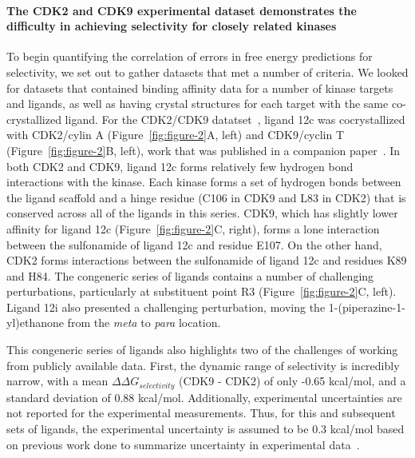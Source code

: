 \documentclass[9pt,lineno]{elife-modified} %
\begin{document}
\paragraph{The CDK2 and CDK9 experimental dataset demonstrates the difficulty in achieving selectivity for closely related kinases}

To begin quantifying the correlation of errors in free energy predictions for selectivity, we set out to gather datasets that met a number of criteria. We looked for datasets that contained binding affinity data for a number of kinase targets and ligands, as well as having crystal structures for each target with the same co-crystallized ligand. For the CDK2/CDK9 datatset~\citep{Shao2013-oe}, ligand 12c was cocrystallized with CDK2/cylin A (Figure~\ref{fig:figure-2}A, left) and CDK9/cyclin T (Figure~\ref{fig:figure-2}B, left), work that was published in a companion paper~\citep{Hole2013-sr}. In both CDK2 and CDK9, ligand 12c forms relatively few hydrogen bond interactions with the kinase. Each kinase forms a set of hydrogen bonds between the ligand scaffold and a hinge residue (C106 in CDK9 and L83 in CDK2) that is conserved across all of the ligands in this series. CDK9, which has slightly lower affinity for ligand 12c (Figure~\ref{fig:figure-2}C, right), forms a lone interaction between the sulfonamide of ligand 12c and residue E107. On the other hand, CDK2 forms interactions between the sulfonamide of ligand 12c and residues K89 and H84. The congeneric series of ligands contains a number of challenging perturbations, particularly at substituent point R3 (Figure~\ref{fig:figure-2}C, left). Ligand 12i also presented a challenging perturbation, moving the 1-(piperazine-1-yl)ethanone from the \emph{meta} to \emph{para} location. 

This congeneric series of ligands also highlights two of the challenges of working from publicly available data. First, the dynamic range of selectivity is incredibly narrow, with a mean $\Delta \Delta G_{selectivity}$ (CDK9 - CDK2) of only -0.65 kcal/mol, and a standard deviation of 0.88 kcal/mol. Additionally, experimental uncertainties are not reported for the experimental measurements. Thus, for this and subsequent sets of ligands, the experimental uncertainty is assumed to be 0.3 kcal/mol based on previous work done to summarize uncertainty in experimental data~\citep{BROWN2009420,Hauser:2018vz}. 
\end{document}
